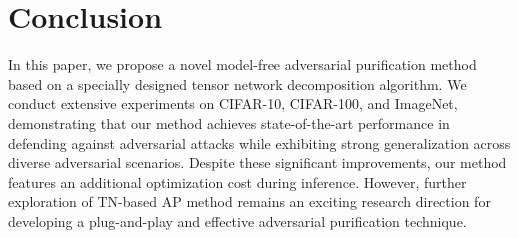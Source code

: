 \section{Conclusion}
\label{Conclusion}
In this paper, we propose a novel model-free adversarial purification method based on a specially designed tensor network decomposition algorithm. We conduct extensive experiments on CIFAR-10, CIFAR-100, and ImageNet, demonstrating that our method achieves state-of-the-art performance in defending against adversarial attacks while exhibiting strong generalization across diverse adversarial scenarios.
Despite these significant improvements, our method features an additional optimization cost during inference.
However, further exploration of TN-based AP method remains an exciting research direction for developing a plug-and-play and effective adversarial purification technique.


